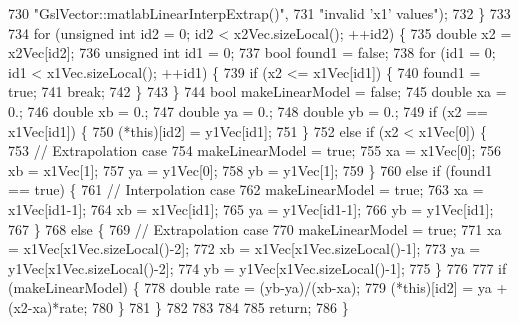 \begin{DoxyCode}
730                         \textcolor{stringliteral}{"GslVector::matlabLinearInterpExtrap()"},
731                         \textcolor{stringliteral}{"invalid 'x1' values"});
732   \}
733 
734   \textcolor{keywordflow}{for} (\textcolor{keywordtype}{unsigned} \textcolor{keywordtype}{int} id2 = 0; id2 < x2Vec.sizeLocal(); ++id2) \{
735     \textcolor{keywordtype}{double} x2 = x2Vec[id2];
736     \textcolor{keywordtype}{unsigned} \textcolor{keywordtype}{int} id1 = 0;
737     \textcolor{keywordtype}{bool} found1 = \textcolor{keyword}{false};
738     \textcolor{keywordflow}{for} (id1 = 0; id1 < x1Vec.sizeLocal(); ++id1) \{
739       \textcolor{keywordflow}{if} (x2 <= x1Vec[id1]) \{
740         found1 = \textcolor{keyword}{true};
741         \textcolor{keywordflow}{break};
742       \}
743     \}
744     \textcolor{keywordtype}{bool} makeLinearModel = \textcolor{keyword}{false};
745     \textcolor{keywordtype}{double} xa = 0.;
746     \textcolor{keywordtype}{double} xb = 0.;
747     \textcolor{keywordtype}{double} ya = 0.;
748     \textcolor{keywordtype}{double} yb = 0.;
749     \textcolor{keywordflow}{if} (x2 == x1Vec[id1]) \{
750       (*this)[id2] = y1Vec[id1];
751     \}
752     \textcolor{keywordflow}{else} \textcolor{keywordflow}{if} (x2 < x1Vec[0]) \{
753       \textcolor{comment}{// Extrapolation case}
754       makeLinearModel = \textcolor{keyword}{true};
755       xa = x1Vec[0];
756       xb = x1Vec[1];
757       ya = y1Vec[0];
758       yb = y1Vec[1];
759     \}
760     \textcolor{keywordflow}{else} \textcolor{keywordflow}{if} (found1 == \textcolor{keyword}{true}) \{
761       \textcolor{comment}{// Interpolation case}
762       makeLinearModel = \textcolor{keyword}{true};
763       xa = x1Vec[id1-1];
764       xb = x1Vec[id1];
765       ya = y1Vec[id1-1];
766       yb = y1Vec[id1];
767     \}
768     \textcolor{keywordflow}{else} \{
769       \textcolor{comment}{// Extrapolation case}
770       makeLinearModel = \textcolor{keyword}{true};
771       xa = x1Vec[x1Vec.sizeLocal()-2];
772       xb = x1Vec[x1Vec.sizeLocal()-1];
773       ya = y1Vec[x1Vec.sizeLocal()-2];
774       yb = y1Vec[x1Vec.sizeLocal()-1];
775     \}
776 
777     \textcolor{keywordflow}{if} (makeLinearModel) \{
778       \textcolor{keywordtype}{double} rate = (yb-ya)/(xb-xa);
779       (*this)[id2] = ya + (x2-xa)*rate;
780     \}
781   \}
782 
783 
784 
785   \textcolor{keywordflow}{return};
786 \}
\end{DoxyCode}
